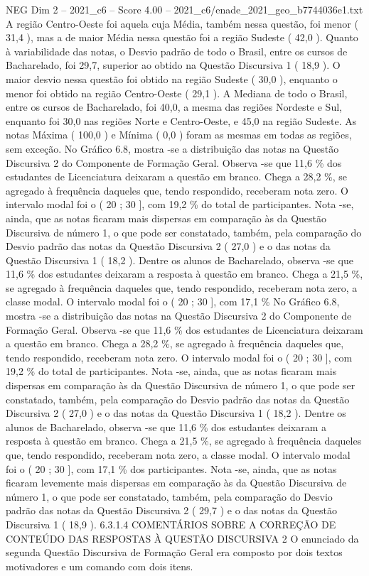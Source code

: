 \begin{textsample}{NEG Dim 2 – 2021\_c6 – Score 4.00 – 2021\_c6/enade\_2021\_geo\_b7744036e1.txt}
A região Centro-Oeste foi aquela cuja Média, também nessa questão, foi menor ( 31,4 ), mas a de maior Média nessa questão foi a região Sudeste ( 42,0 ).
Quanto à variabilidade das notas, o Desvio padrão de todo o Brasil, entre os cursos de Bacharelado, foi 29,7, superior ao obtido na Questão Discursiva 1 ( 18,9 ).
O maior desvio nessa questão foi obtido na região Sudeste ( 30,0 ), enquanto o menor foi obtido na região Centro-Oeste ( 29,1 ).
A Mediana de todo o Brasil, entre os cursos de Bacharelado, foi 40,0, a mesma das regiões Nordeste e Sul, enquanto foi 30,0 nas regiões Norte e Centro-Oeste, e 45,0 na região Sudeste.
As notas Máxima ( 100,0 ) e Mínima ( 0,0 ) foram as mesmas em todas as regiões, sem exceção.
No Gráfico 6.8, mostra -se a distribuição das notas na Questão Discursiva 2 do Componente de Formação Geral.
Observa -se que 11,6 \% dos estudantes de Licenciatura deixaram a questão em branco.
Chega a 28,2 \%, se agregado à frequência daqueles que, tendo respondido, receberam nota zero.
O intervalo modal foi o ( 20 ; 30 ], com 19,2 \% do total de participantes.
Nota -se, ainda, que as notas ficaram mais dispersas em comparação às da Questão Discursiva de número 1, o que pode ser constatado, também, pela comparação do Desvio padrão das notas da Questão Discursiva 2 ( 27,0 ) e o das notas da Questão Discursiva 1 ( 18,2 ).
Dentre os alunos de Bacharelado, observa -se que 11,6 \% dos estudantes deixaram a resposta à questão em branco.
Chega a 21,5 \%, se agregado à frequência daqueles que, tendo respondido, receberam nota zero, a classe modal.
O intervalo modal foi o ( 20 ; 30 ], com 17,1 \% No Gráfico 6.8, mostra -se a distribuição das notas na Questão Discursiva 2 do Componente de Formação Geral.
Observa -se que 11,6 \% dos estudantes de Licenciatura deixaram a questão em branco.
Chega a 28,2 \%, se agregado à frequência daqueles que, tendo respondido, receberam nota zero.
O intervalo modal foi o ( 20 ; 30 ], com 19,2 \% do total de participantes.
Nota -se, ainda, que as notas ficaram mais dispersas em comparação às da Questão Discursiva de número 1, o que pode ser constatado, também, pela comparação do Desvio padrão das notas da Questão Discursiva 2 ( 27,0 ) e o das notas da Questão Discursiva 1 ( 18,2 ).
Dentre os alunos de Bacharelado, observa -se que 11,6 \% dos estudantes deixaram a resposta à questão em branco.
Chega a 21,5 \%, se agregado à frequência daqueles que, tendo respondido, receberam nota zero, a classe modal.
O intervalo modal foi o ( 20 ; 30 ], com 17,1 \% dos participantes.
Nota -se, ainda, que as notas ficaram levemente mais dispersas em comparação às da Questão Discursiva de número 1, o que pode ser constatado, também, pela comparação do Desvio padrão das notas da Questão Discursiva 2 ( 29,7 ) e o das notas da Questão Discursiva 1 ( 18,9 ). 6.3.1.4 COMENTÁRIOS SOBRE A CORREÇÃO DE CONTEÚDO DAS RESPOSTAS À QUESTÃO DISCURSIVA 2 O enunciado da segunda Questão Discursiva de Formação Geral era composto por dois textos motivadores e um comando com dois itens.

\end{textsample}
